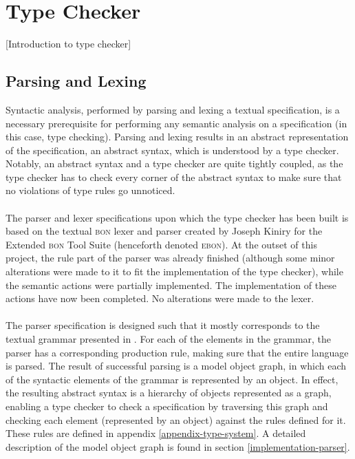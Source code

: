 \section{Type Checker}
[Introduction to type checker]
\subsection{Parsing and Lexing}
\label{design-parsing}
Syntactic analysis, performed by parsing and lexing a textual \bon{} specification, is a necessary prerequisite for performing any semantic analysis on a specification (in this case, type checking). Parsing and lexing results in an abstract representation of the specification, an abstract syntax, which is understood by a type checker. Notably, an abstract syntax and a type checker are quite tightly coupled, as the type checker has to check every corner of the abstract syntax to make sure that no violations of type rules go unnoticed.
\paragraph{}
The parser and lexer specifications upon which the type checker has been built is based on the textual \textsc{bon} lexer and parser created by Joseph Kiniry for the Extended \textsc{bon} Tool Suite \cite{ebon} (henceforth denoted \textsc{ebon}). At the outset of this project, the rule part of the parser was already finished (although some minor alterations were made to it to fit the implementation of the type checker), while the semantic actions were partially implemented. The implementation of these actions have now been completed. No alterations were made to the lexer.

\paragraph{}
The parser specification is designed such that it mostly corresponds to the textual \bon{} grammar presented in \cite{walden1995}. For each of the elements in the grammar, the parser has a corresponding production rule, making sure that the entire language is parsed. The result of successful parsing is a model object graph, in which each of the syntactic elements of the grammar is represented by an object. In effect, the resulting abstract syntax is a hierarchy of objects represented as a graph, enabling a type checker to check a \bon{} specification by traversing this graph and checking each element (represented by an object) against the rules defined for it. These rules are defined in appendix \ref{appendix-type-system}. A detailed description of the model object graph is found in section \ref{implementation-parser}.

